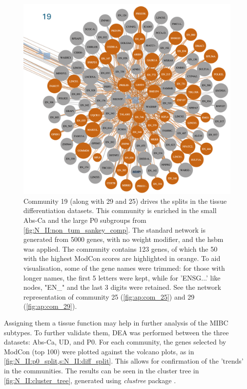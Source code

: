 \begin{figure}[H]    
    \centering
    \includegraphics[width=1.0\textwidth,height=1.0\textheight,keepaspectratio]{Sections/Network_II/resources/non_tum/19_com.png}
    \caption{Community 19 (along with 29 and 25) drives the splits in the tissue differentiation datasets. This community is enriched in the small Abs-Ca and the large P0 subgroups from \cref{fig:N_II:non_tum_sankey_comp}. The standard network is generated from 5000 genes, with no weight modifier, and the \acrshort{hsbm} was applied. The community contains 123 genes, of which the 50 with the highest ModCon scores are highlighted in orange. To aid visualisation, some of the gene names were trimmed: for those with longer names, the first 5 letters were kept, while for 'ENSG...' like nodes, "EN\_" and the last 3 digits were retained. See the network representation of community 25 (\cref{fig:ap:com_25}) and 29 (\cref{fig:ap:com_29}).}
    \label{fig:N_II:19_com}
\end{figure}


Assigning them a tissue function may help in further analysis of the MIBC subtypes. To further validate them, DEA was performed between the three datasets: Abs-Ca, UD, and P0. For each community, the genes selected by ModCon (top 100) were plotted against the volcano plots, as in \cref{fig:N_II:p0_split,s:N_II:diff_split}. This allows for confirmation of the 'trends' in the communities. The results can be seen in the cluster tree in \cref{fig:N_II:cluster_tree}, generated using \textit{clustree} package \cite{Zappia2018-bt}.

